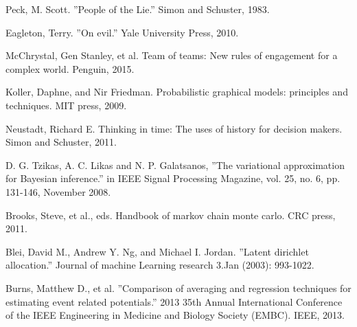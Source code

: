 \documentclass{article}
\begin{document}
\newpage
\begin{thebibliography}{9}

Peck, M. Scott. ''People of the Lie.'' Simon and Schuster, 1983.

Eagleton, Terry. ''On evil.'' Yale University Press, 2010.

McChrystal, Gen Stanley, et al. Team of teams: New rules of engagement for a complex world. Penguin, 2015.

Koller, Daphne, and Nir Friedman. Probabilistic graphical models: principles and techniques. MIT press, 2009.

Neustadt, Richard E. Thinking in time: The uses of history for decision makers. Simon and Schuster, 2011.

D. G. Tzikas, A. C. Likas and N. P. Galatsanos, ''The variational approximation for Bayesian inference.'' in IEEE Signal Processing Magazine, vol. 25, no. 6, pp. 131-146, November 2008.

Brooks, Steve, et al., eds. Handbook of markov chain monte carlo. CRC press, 2011.

Blei, David M., Andrew Y. Ng, and Michael I. Jordan. ''Latent dirichlet allocation.'' Journal of machine Learning research 3.Jan (2003): 993-1022.

Burns, Matthew D., et al. ''Comparison of averaging and regression techniques for estimating event related potentials.'' 2013 35th Annual International Conference of the IEEE Engineering in Medicine and Biology Society (EMBC). IEEE, 2013.
\end{thebibliography}
\end{document}
